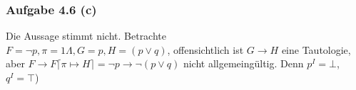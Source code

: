 \subsubsection{Aufgabe 4.6 (c)}
Die Aussage stimmt nicht. Betrachte\\
$F=\neg p,\pi=1\Lambda,G=p,H=(p\vee q)$, offensichtlich ist $G\to H$ eine Tautologie, aber $F\to F\lceil\pi\mapsto H\rceil=\neg p\to\neg(p\vee q)$ nicht allgemeingültig. Denn $p^I=\bot$, $q^I=\top$)


